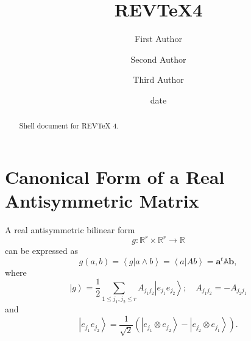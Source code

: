 \documentclass[aps,preprint]{revtex4}%
\begin{document}
\title[Short title for running header]{REV\TeX4}
\author{First Author}
\author{Second Author}
\author{Third Author}

\begin{abstract}
Shell document for REV\TeX{} 4.

\end{abstract}
\date[Date text]{date}




\maketitle
\tableofcontents


\section{Canonical Form of a Real Antisymmetric Matrix\label{realanti}}

A real antisymmetric bilinear form
\begin{equation}
g:\mathbb{R}^{r}\times\mathbb{R}^{r}\rightarrow\mathbb{R}%
\end{equation}
can be expressed as
\begin{equation}
g\left(  a,b\right)  =\left\langle g\left\vert a\wedge b\right.  \right\rangle
=\left\langle a\left\vert Ab\right.  \right\rangle =\mathbf{a}^{t}%
\mathbb{A}\mathbf{b},
\end{equation}
where
\begin{equation}
\left\vert g\right\rangle =\frac{1}{2}\sum_{1\leq j_{1},j_{2}\leq r}%
A_{j_{1}j_{2}}\left\vert e_{j_{1}}e_{j_{2}}\right\rangle ;\quad A_{j_{1}j_{2}%
}=-A_{j_{2}j_{1}}%
\end{equation}
and
\begin{equation}
\left\vert e_{j_{1}}e_{j_{2}}\right\rangle =\frac{1}{\sqrt{2}}\left(
\left\vert e_{j_{1}}\otimes e_{j_{2}}\right\rangle -\left\vert e_{j_{2}%
}\otimes e_{j_{1}}\right\rangle \right)  .
\end{equation}
\end{document}
